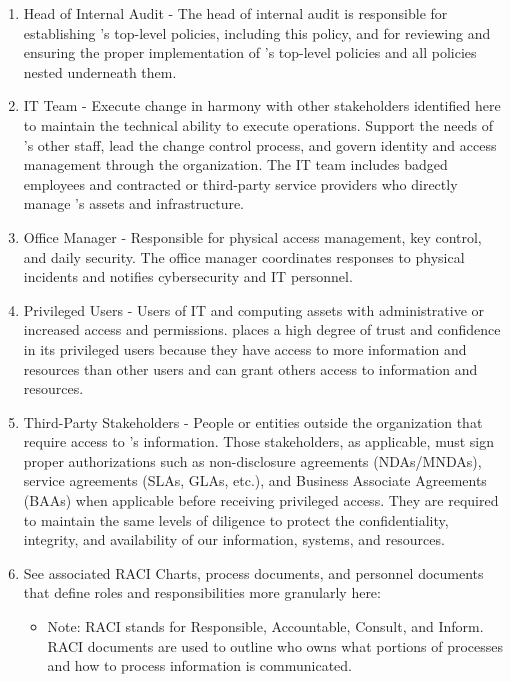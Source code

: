 \documentclass[../main.tex]{subfiles}
\begin{document}
\begin{enumerate}
    \item Head of Internal Audit - The head of internal audit is responsible for establishing \CompanyName's top-level policies, including this policy, and for reviewing and ensuring the proper
    implementation of \CompanyName's top-level policies and all policies nested underneath them.
    \item IT Team - Execute change in harmony with other stakeholders identified here to maintain the technical ability to execute \CompanyName operations. Support the needs of \CompanyName's
    other staff, lead the change control process, and govern identity and access management through the organization. The IT team includes badged employees and contracted or third-party service
    providers who directly manage \CompanyName's assets and infrastructure.
    \item Office Manager - Responsible for physical access management, key control, and daily security. The office manager coordinates responses to physical incidents and notifies cybersecurity
    and IT personnel.
    \item Privileged Users - Users of \CompanyName IT and computing assets with administrative or increased access and permissions. \CompanyName places a high degree of trust and confidence in
    its privileged users because they have access to more information and resources than other users and can grant others access to information and resources.
    \item Third-Party Stakeholders - People or entities outside the organization that require access to \CompanyName's information. Those stakeholders, as applicable, must sign proper authorizations
    such as non-disclosure agreements (NDAs/MNDAs), service agreements (SLAs, GLAs, etc.), and Business Associate Agreements (BAAs) when applicable before receiving privileged access. They are
    required to maintain the same levels of diligence to protect the confidentiality, integrity, and availability of our information, systems, and resources.
    \item See associated RACI Charts, process documents, and personnel documents that define roles and responsibilities more granularly here: \RACIDocs
    \begin{itemize}
      \item Note: RACI stands for Responsible, Accountable, Consult, and Inform. RACI documents are used to outline who owns what portions of processes and how to process information is communicated.
    \end{itemize}
  \end{enumerate}
\end{document}
